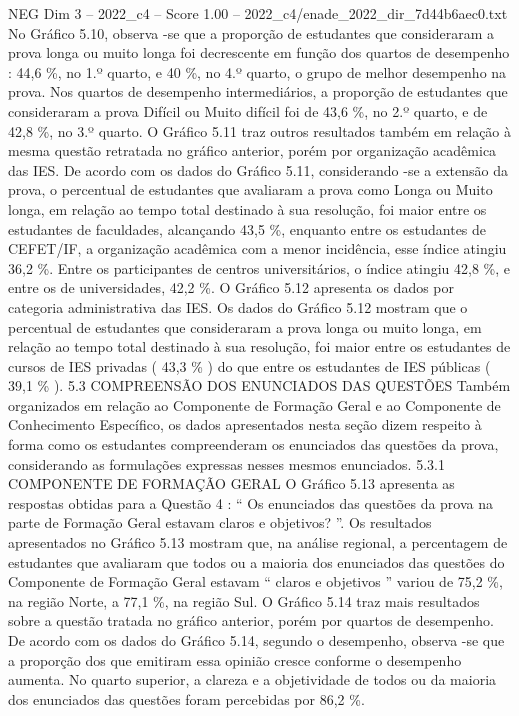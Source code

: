 \begin{textsample}{NEG Dim 3 – 2022\_c4 – Score 1.00 – 2022\_c4/enade\_2022\_dir\_7d44b6aec0.txt}
No Gráfico 5.10, observa -se que a proporção de estudantes que consideraram a prova longa ou muito longa foi decrescente em função dos quartos de desempenho : 44,6 \%, no 1.º quarto, e 40 \%, no 4.º quarto, o grupo de melhor desempenho na prova.
Nos quartos de desempenho intermediários, a proporção de estudantes que consideraram a prova Difícil ou Muito difícil foi de 43,6 \%, no 2.º quarto, e de 42,8 \%, no 3.º quarto.
O Gráfico 5.11 traz outros resultados também em relação à mesma questão retratada no gráfico anterior, porém por organização acadêmica das IES.
De acordo com os dados do Gráfico 5.11, considerando -se a extensão da prova, o percentual de estudantes que avaliaram a prova como Longa ou Muito longa, em relação ao tempo total destinado à sua resolução, foi maior entre os estudantes de faculdades, alcançando 43,5 \%, enquanto entre os estudantes de CEFET/IF, a organização acadêmica com a menor incidência, esse índice atingiu 36,2 \%.
Entre os participantes de centros universitários, o índice atingiu 42,8 \%, e entre os de universidades, 42,2 \%.
O Gráfico 5.12 apresenta os dados por categoria administrativa das IES.
Os dados do Gráfico 5.12 mostram que o percentual de estudantes que consideraram a prova longa ou muito longa, em relação ao tempo total destinado à sua resolução, foi maior entre os estudantes de cursos de IES privadas ( 43,3 \% ) do que entre os estudantes de IES públicas ( 39,1 \% ). 5.3 COMPREENSÃO DOS ENUNCIADOS DAS QUESTÕES Também organizados em relação ao Componente de Formação Geral e ao Componente de Conhecimento Específico, os dados apresentados nesta seção dizem respeito à forma como os estudantes compreenderam os enunciados das questões da prova, considerando as formulações expressas nesses mesmos enunciados. 5.3.1 COMPONENTE DE FORMAÇÃO GERAL O Gráfico 5.13 apresenta as respostas obtidas para a Questão 4 : “ Os enunciados das questões da prova na parte de Formação Geral estavam claros e objetivos? ”.
Os resultados apresentados no Gráfico 5.13 mostram que, na análise regional, a percentagem de estudantes que avaliaram que todos ou a maioria dos enunciados das questões do Componente de Formação Geral estavam “ claros e objetivos ” variou de 75,2 \%, na região Norte, a 77,1 \%, na região Sul.
O Gráfico 5.14 traz mais resultados sobre a questão tratada no gráfico anterior, porém por quartos de desempenho.
De acordo com os dados do Gráfico 5.14, segundo o desempenho, observa -se que a proporção dos que emitiram essa opinião cresce conforme o desempenho aumenta.
No quarto superior, a clareza e a objetividade de todos ou da maioria dos enunciados das questões foram percebidas por 86,2 \%.

\end{textsample}
